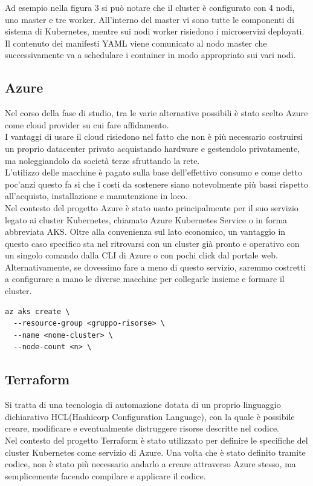\documentclass[a4paper,12pt]{report}
\begin{document}
Ad esempio nella figura 3 si può notare che il cluster è configurato con 4 nodi, uno master e tre worker. All'interno del master vi sono tutte le componenti di sistema di Kubernetes, mentre sui nodi worker risiedono i microservizi deployati. Il contenuto dei manifesti YAML viene comunicato al nodo master che successivamente va a schedulare i container in modo appropriato sui vari nodi.

\subsection{Azure}
Nel corso della fase di studio, tra le varie alternative possibili è stato scelto Azure come cloud provider su cui fare affidamento.\\
I vantaggi di usare il cloud risiedono nel fatto che non è più necessario costruirsi un proprio datacenter privato acquistando hardware e gestendolo privatamente, ma noleggiandolo da società terze sfruttando la rete.\cite{cloud}\\
L'utilizzo delle macchine è pagato sulla base dell'effettivo consumo e come detto poc'anzi questo fa si che i costi da sostenere siano notevolmente più bassi rispetto all'acquisto, installazione e manutenzione in loco.\\
Nel contesto del progetto Azure è stato usato principalmente per il suo servizio legato ai cluster Kubernetes, chiamato Azure Kubernetes Service o in forma abbreviata AKS. Oltre alla convenienza sul lato economico, un vantaggio in questo caso specifico sta nel ritrovarsi con un cluster già pronto e operativo con un singolo comando dalla CLI di Azure o con pochi click dal portale web.\\
Alternativamente, se dovessimo fare a meno di questo servizio, saremmo costretti a configurare a mano le diverse macchine per collegarle insieme e formare il cluster. 
\begin{lstlisting}[caption={\\\textit{Esempio di comando per creare un cluster Kubernetes come servizio di Azure da Azure CLI. Gli argomenti passati sono il gruppo risorse in cui deployare la risorsa di tipo AKS, il nome attribuito al cluster e il numero di nodi desiderati.}}]
az aks create \
  --resource-group <gruppo-risorse> \
  --name <nome-cluster> \
  --node-count <n> \
\end{lstlisting}

\subsection{Terraform}
Si tratta di una tecnologia di automazione dotata di un proprio linguaggio dichiarativo HCL(Hashicorp Configuration Language), con la quale è possibile creare, modificare e eventualmente distruggere risorse descritte nel codice.\\
Nel contesto del progetto Terraform è stato utilizzato per definire le specifiche del cluster Kubernetes come servizio di Azure. Una volta che è stato definito tramite codice, non è stato più necessario andarlo a creare attraverso Azure stesso, ma semplicemente facendo compilare e applicare il codice.
\end{document}
